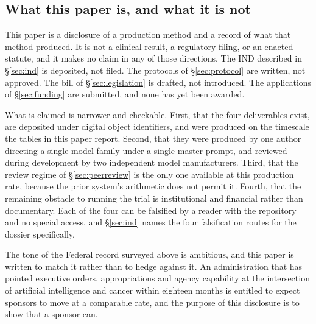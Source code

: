 \subsection{What this paper is, and what it is not}

This paper is a disclosure of a production method and a record of what that
method produced. It is not a clinical result, a regulatory filing, or an enacted
statute, and it makes no claim in any of those directions. The IND described in
\S\ref{sec:ind} is deposited, not filed. The protocols of
\S\ref{sec:protocol} are written, not approved. The bill of
\S\ref{sec:legislation} is drafted, not introduced. The applications of
\S\ref{sec:funding} are submitted, and none has yet been awarded.

What is claimed is narrower and checkable. First, that the four deliverables
exist, are deposited under digital object identifiers, and were produced on the
timescale the tables in this paper report. Second, that they were produced by
one author directing a single model family under a single master prompt, and
reviewed during development by two independent model manufacturers. Third, that
the review regime of \S\ref{sec:peerreview} is the only one available at this
production rate, because the prior system's arithmetic does not permit it.
Fourth, that the remaining obstacle to running the trial is institutional and
financial rather than documentary. Each of the four can be falsified by a reader
with the repository and no special access, and \S\ref{sec:ind} names the four
falsification routes for the dossier specifically.

The tone of the Federal record surveyed above is ambitious, and this paper is
written to match it rather than to hedge against it. An administration that has
pointed executive orders, appropriations and agency capability at the
intersection of artificial intelligence and cancer within eighteen months is
entitled to expect sponsors to move at a comparable rate, and the purpose of
this disclosure is to show that a sponsor can.
